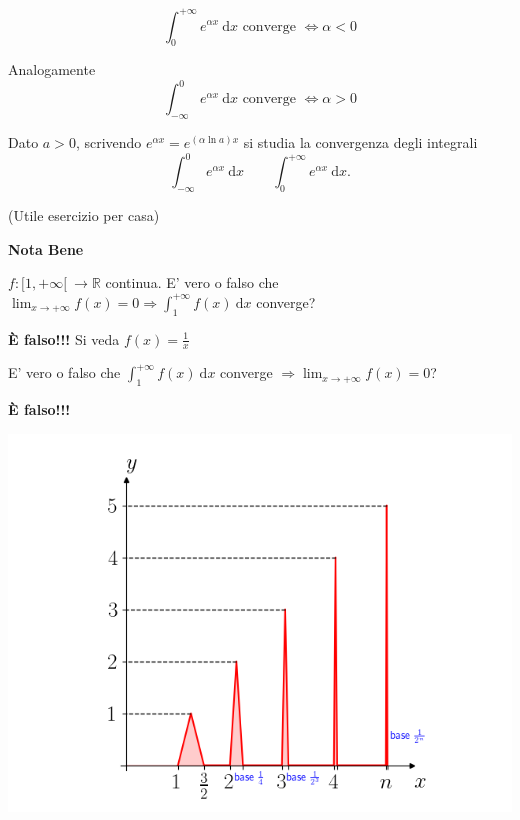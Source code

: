 \begin{attbar}
	\begin{equation*}
		\int_{0}^{+\infty} e^{\alpha x} \ \mathrm{d}x \text{ converge } \iff \alpha < 0
	\end{equation*}
	
	Analogamente
	\begin{equation*}
		\int_{-\infty}^{0} e^{\alpha x} \ \mathrm{d}x \text{ converge } \iff  \alpha > 0
	\end{equation*}
\end{attbar}

Dato $ a>0$, scrivendo $e^{\alpha x} = e^{(\alpha \ln a)x}$ si studia la convergenza degli integrali
\begin{equation*}
	\int_{-\infty}^{0} e^{\alpha x} \ \mathrm{d}x \qquad \int_{0}^{+\infty}  e^{\alpha x} \ \mathrm{d}x.
\end{equation*}

(Utile esercizio per casa)


\textbf{Nota Bene}

$f:[1,+\infty[ \ \rightarrow \mathbb{R}$ continua. E' vero o falso che $\lim_{x \rightarrow +\infty} f(x)=0 \Rightarrow \int_{1}^{+\infty} f(x) \ \mathrm{d}x$ converge?

\begin{center}
	\textbf{È falso!!!} Si veda $f(x)=\frac{1}{x}$
\end{center}

E' vero o falso che
$\int_{1}^{+\infty}f(x) \ \mathrm{d}x$ converge $\Rightarrow \lim_{x \rightarrow +\infty} f(x) = 0$?

\begin{center}
	\textbf{È falso!!!}
\end{center}

\begin{center}
	\includegraphics[width=0.75\linewidth]{integrali_impropri/pag85}
	\label{fig:pag85}
\end{center}

